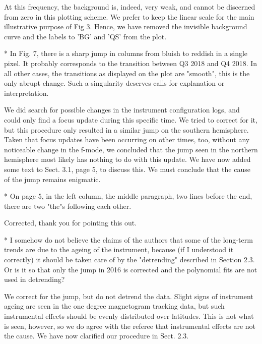 \documentclass[12pt, letterpaper]{article}
\newcommand{\blue}{\color{blue}}
\begin{document}
\medskip \noindent At this frequency, the background is, indeed, very weak, and cannot be discerned from zero in this plotting scheme. We prefer to keep the linear scale for the main illustrative purpose of Fig 3. Hence, we have removed the invisible background curve and the labels to 'BG' and 'QS' from the plot.  \medskip

{\blue * In Fig. 7, there is a sharp jump in columns from bluish to reddish in a single pixel. It probably corresponds to the transition between Q3 2018 and Q4 2018. In all other cases, the transitions as displayed on the plot are "smooth", this is the only abrupt change. Such a singularity deserves calls for explanation or interpretation.}

\medskip \noindent We did search for possible changes in the instrument configuration logs, and could only find a focus update during this specific time. We tried to correct for it, but this procedure only resulted in a similar jump on the southern hemisphere. Taken that focus updates have been occurring on other times, too, without any noticeable change in the f-mode, we concluded that the jump seen in the northern hemisphere most likely has nothing to do with this update. We have now added some text to Sect. 3.1, page 5, to discuss this. We must conclude that the cause of the jump remains enigmatic. \medskip

{\blue * On page 5, in the left column, the middle paragraph, two lines before the end, there are two "the"s following each other.}

\medskip \noindent Corrected, thank you for pointing this out. \medskip

{\blue * I somehow do not believe the claims of the authors that some of the long-term trends are due to the ageing of the instrument, because (if I understood it correctly) it should be taken care of by the "detrending" described in Section 2.3. Or is it so that only the jump in 2016 is corrected and the polynomial fits are not used in detrending?}

\medskip \noindent We correct for the jump, but do not detrend the data. Slight signs of instrument ageing are seen in the one degree magnetogram tracking data, but such instrumental effects should be evenly distributed over latitudes. This is not what is seen, however, so we do agree with the referee that instrumental effects are not the cause. We have now clarified our procedure in Sect. 2.3.
\end{document}
